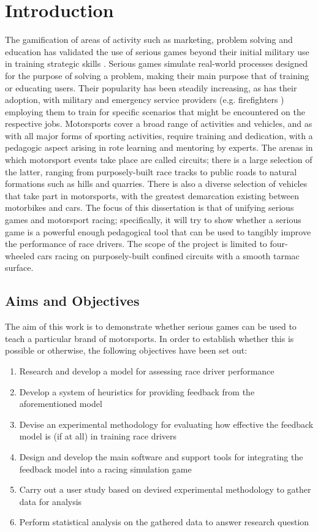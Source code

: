 \documentclass{sig-alternate}
\begin{document}
\section{Introduction}
The gamification of areas of activity such as marketing, problem solving and education \cite{michael2005serious} has validated the use of serious games beyond their initial military use in training strategic skills \cite{djaouti2011classifying}.  Serious games simulate real-world processes designed for the purpose of solving a problem, making their main purpose that of training or educating users. Their popularity has been steadily increasing, as has their adoption, with military \cite{djaouti2011classifying} and emergency service providers (e.g. firefighters \cite{michael2005serious}) employing them to train for specific scenarios that might be encountered on the respective jobs. Motorsports cover a broad range of activities and vehicles, and as with all major forms of sporting activities, require training and dedication, with a pedagogic aspect arising in rote learning and mentoring by experts. The arenas in which motorsport events take place are called circuits; there is a large selection of the latter, ranging from purposely-built race tracks to public roads to natural formations such as hills and quarries. There is also a diverse selection of vehicles that take part in motorsports, with the greatest demarcation existing between motorbikes and cars. The focus of this dissertation is that of unifying serious games and motorsport racing; specifically, it will try to show whether a serious game is a powerful enough pedagogical tool that can be used to tangibly improve the performance of race drivers. The scope of the project is limited to four-wheeled cars racing on purposely-built confined circuits with a smooth tarmac surface.

\subsection{Aims and Objectives}
The aim of this work is to demonstrate whether serious games can be used to teach a particular brand of motorsports. In order to establish whether this is possible or otherwise, the following objectives have been set out:

\begin{enumerate}
	\item Research and develop a model for assessing race driver performance
	\item Develop a system of heuristics for providing feedback from the aforementioned model
	\item Devise an experimental methodology for evaluating how effective the feedback model is (if at all) in training race drivers
	\item Design and develop the main software and support tools for integrating the feedback model into a racing simulation game
	\item Carry out a user study based on devised experimental methodology to gather data for analysis
	\item Perform statistical analysis on the gathered data to answer research question
\end{enumerate}
\end{document}
